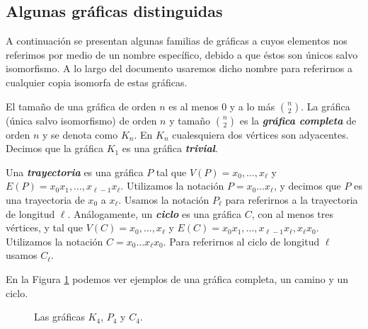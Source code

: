 \subsection{Algunas gráficas distinguidas}

A continuación se presentan algunas familias de gráficas a cuyos elementos nos referimos por medio de un nombre específico, debido a que \'estos son \'unicos salvo isomorfismo. A lo largo del documento usaremos dicho nombre para referirnos a cualquier copia isomorfa de estas gráficas.

El tamaño de una gráfica de orden $n$ es al menos $0$ y a lo más $\binom{n}{2}$. La gráfica (\'unica salvo isomorfismo) de orden $n$ y tamaño $\binom{n}{2}$ es la \textbf{\emph{gráfica completa}} de orden $n$ y se denota como $K_n$. En $K_n$ cualesquiera dos vértices son adyacentes. Decimos que la gráfica $K_1$ es una gráfica \textbf{\emph{trivial}}.



Una \textbf{\emph{trayectoria}} es una gráfica $P$ tal que $V(P) =
{x_0,\dots,x_\ell}$ y $E(P) = {x_0x_1,\dots,x_{\ell-1}x_\ell}$.
Utilizamos la notaci\'on $P = x_0 \dots x_\ell$, y decimos
que $P$ es una trayectoria de $x_0$ a $x_\ell$. Usamos la notaci\'on
$P_\ell$ para referirnos a la trayectoria de longitud $\ell$. An\'alogamente,
un \textbf{\emph{ciclo}} es una gráfica $C$, con al menos tres v\'ertices,
y tal que $V(C) = {x_0,\dots,x_\ell}$ y $E(C) = {x_0x_1,\dots,x_{\ell-1}x_\ell,
x_\ell x_0}$. Utilizamos la notaci\'on $C = x_0 \dots x_\ell x_0$. Para
referirnos al ciclo de longitud $\ell$ usamos $C_\ell$.

En la Figura \ref{fig_tipos_graficas} podemos ver ejemplos de una gráfica completa, un camino y un ciclo.

\begin{figure}[!htbp]
\centering

\caption{Las gráficas $K_4$, $P_4$ y $C_4$.}
\label{fig_tipos_graficas}
\end{figure}

